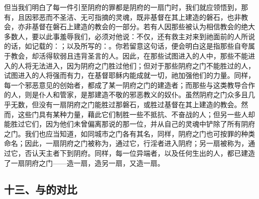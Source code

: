 但当我们明白了每一件引至阴府的罪都是阴府的一扇门时，我们就应领悟到，那有，且因邪恶而不圣洁、无可指摘的灵魂，既非基督在其上建造的磐石，也非教会，亦非基督在磐石上建造的教会的一部分。若有人因那些被认为相信教会的绝大多数人，要以此事羞辱我们，必须对他说：不仅，还有救主对来到祂面前的人所说的话，如记载的：；以及所写的：。你若留意这句话，便会明白这是指那些自夸属于教会，却活得软弱且违背圣言的人。因此，在那些试图进入的人中，那些不能进入的人将无法进入，因为阴府之门胜过他们；但对于那些阴府之门不能胜过的人，试图进入的人将强而有力，在基督耶稣内能成就一切，祂加强他们的力量。同样，每一个邪恶意见的创始者，都成了某一阴府之门的建造者；而那些与这类教导合作的人，则是仆人和管家，是那建造不敬的邪恶教义的奴仆。虽然阴府之门众多且几乎无数，但没有一扇阴府之门能胜过那磐石，或胜过基督在其上建造的教会。然而，这些门具有某种力量，藉此它们制胜一些不抵抗、不奋战的人；但另一些人却能胜过它们，因为他们未曾偏离那说的那一位，并从自己的灵魂中铲除了所有阴府之门。我们也应当知道，如同城市之门各有其名，同样，阴府之门也可按罪的种类命名；因此，一扇阴府之门被称为，通过它，行淫者进入阴府；另一扇被称为，通过它，否认天主者下到阴府。同样，每一位异端者，以及任何生出的人，都已建造了一扇阴府之门——造一扇，造另一扇，又造一扇。\par


\subsection{十三、与的对比}

